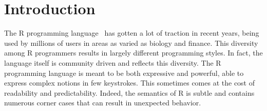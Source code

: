 \documentclass[
    sigplan,
    10pt,
    review, %
    natbib=false %
 ]{acmart}
\begin{document}



\maketitle

\section{Introduction}
\label{sec:intro}

The R programming language~\parencite{R, ihaka1996r, Rwebsite}
has gotten a lot of traction in recent years, being used by millions of users in areas as varied as biology and finance. This diversity among R programmers results in largely different programming styles. In fact, the language itself is community driven and reflects this diversity.
The R programming language is meant to be both expressive and powerful,
able to express complex notions in few keystrokes.
This sometimes comes at the cost of readability and predictability. Indeed, 
the semantics of R is subtle and contains numerous corner cases that can result in unexpected behavior. 
\end{document}
